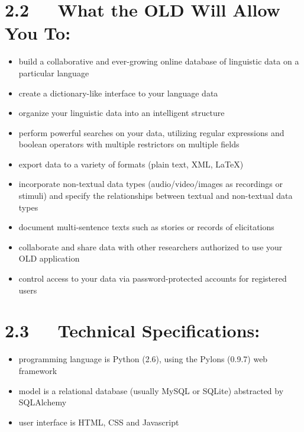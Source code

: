 \documentclass[letterpaper,10pt,english]{sphinxmanual}
\begin{document}
\section{2.2   What the OLD Will Allow You To:}
\label{documentation:what-the-old-will-allow-you-to}\begin{itemize}
\item {} 
build a collaborative and ever-growing online database of linguistic data on a
particular language

\item {} 
create a dictionary-like interface to your language data

\item {} 
organize your linguistic data into an intelligent structure

\item {} 
perform powerful searches on your data, utilizing regular expressions and
boolean operators with multiple restrictors on multiple fields

\item {} 
export data to a variety of formats (plain text, XML, LaTeX)

\item {} 
incorporate non-textual data types (audio/video/images as recordings or
stimuli) and specify the relationships between textual and non-textual data
types

\item {} 
document multi-sentence texts such as stories or records of elicitations

\item {} 
collaborate and share data with other researchers authorized to use your OLD
application

\item {} 
control access to your data via password-protected accounts for registered
users

\end{itemize}


\section{2.3   Technical Specifications:}
\label{documentation:technical-specifications}\begin{itemize}
\item {} 
programming language is Python (2.6), using the Pylons (0.9.7) web framework

\item {} 
model is a relational database (usually MySQL or SQLite) abstracted by
SQLAlchemy

\item {} 
user interface is HTML, CSS and Javascript

\end{itemize}
\end{document}
